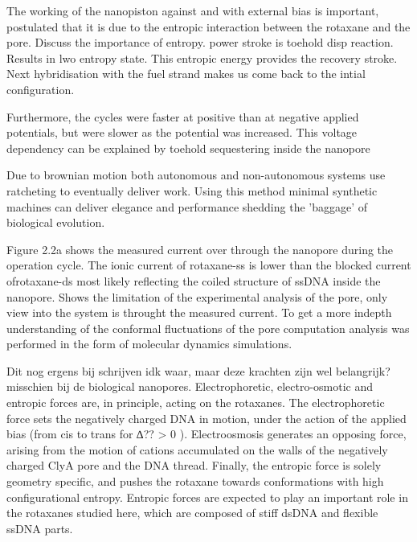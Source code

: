 The working of the nanopiston against and with external bias is important, postulated
that it is due to the entropic interaction between the rotaxane and the pore.
Discuss the importance of entropy. power stroke is toehold disp reaction. Results in lwo
entropy state. This entropic energy provides the recovery stroke. Next hybridisation with
the fuel strand makes us come back to the intial configuration.

Furthermore, the cycles were faster at positive than at negative applied potentials, but
were slower as the potential was increased. This voltage dependency can be explained by
toehold sequestering inside the nanopore

Due to brownian motion both autonomous and non-autonomous systems use ratcheting to
eventually deliver work. Using this method minimal synthetic machines can deliver
elegance and performance shedding the 'baggage' of biological evolution.

Figure 2.2a shows the measured current over through the nanopore during the operation
cycle. The ionic current of rotaxane-ss is lower than the blocked current ofrotaxane-ds
most likely reflecting the coiled structure of ssDNA inside the nanopore. Shows the
limitation of the experimental analysis of the pore, only view into the system is
throught the measured current. To get a more indepth understanding of the conformal
fluctuations of the pore computation analysis was performed in the form of molecular
dynamics simulations.


Dit nog ergens bij schrijven idk waar, maar deze krachten zijn wel belangrijk?
misschien bij de biological nanopores.
Electrophoretic, electro-osmotic and entropic forces are, in principle, acting on the
rotaxanes. The electrophoretic force sets the negatively charged DNA in motion, under the
action of the applied bias (from cis to trans for
∆?? > 0 ). Electroosmosis generates an opposing force, arising from the motion of cations
accumulated on the walls of the negatively charged ClyA pore and the DNA thread. Finally,
the entropic force is solely geometry specific, and pushes the rotaxane towards
conformations with high configurational entropy. Entropic forces are expected to play an
important role in the rotaxanes studied here, which are composed of stiff dsDNA and
flexible ssDNA parts.



